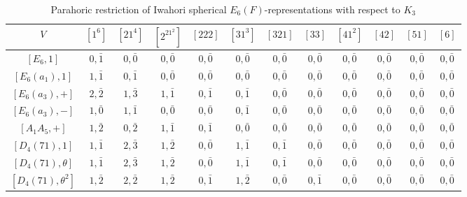     \newpage
    \begin{table}[ht]
        \centering
        \caption{Parahoric restriction of Iwahori spherical $E_6(F)$-representations with respect to $K_3$}
        \label{tab:e6_WJ3_restriction_final}
        \begin{adjustbox}{max width=\linewidth}
        \begin{tabular}{|c|ccccccccccc|}
        \hline
        $V$ & $[1^6]$ & $[21^4]$ & $[2^21^2]$ & $[222]$ & $[31^3]$ & $[321]$ & $[33]$ & $[41^2]$ & $[42]$ & $[51]$ & $[6]$ \\ \hline
        $[E_6, 1]$             & $0, \bar{1}$ & $0, \bar{0}$ & $0, \bar{0}$ & $0, \bar{0}$ & $0, \bar{0}$ & $0, \bar{0}$ & $0, \bar{0}$ & $0, \bar{0}$ & $0, \bar{0}$ & $0, \bar{0}$ & $0, \bar{0}$ \\ \hline

        $[E_6(a_1), 1]$        & $1, \bar{1}$ & $0, \bar{1}$ & $0, \bar{0}$ & $0, \bar{0}$ & $0, \bar{0}$ & $0, \bar{0}$ & $0, \bar{0}$ & $0, \bar{0}$ & $0, \bar{0}$ & $0, \bar{0}$ & $0, \bar{0}$ \\ \hline

        $[E_6(a_3), +]$        & $2, \bar{2}$ & $1, \bar{3}$ & $1, \bar{1}$ & $0, \bar{1}$ & $0, \bar{1}$ & $0, \bar{0}$ & $0, \bar{0}$ & $0, \bar{0}$ & $0, \bar{0}$ & $0, \bar{0}$ & $0, \bar{0}$ \\
        $[E_6(a_3), -]$        & $1, \bar{0}$ & $1, \bar{1}$ & $0, \bar{0}$ & $0, \bar{0}$ & $0, \bar{1}$ & $0, \bar{0}$ & $0, \bar{0}$ & $0, \bar{0}$ & $0, \bar{0}$ & $0, \bar{0}$ & $0, \bar{0}$ \\
        $[A_1A_5, +]$          & $1, \bar{2}$ & $0, \bar{2}$ & $1, \bar{1}$ & $0, \bar{1}$ & $0, \bar{0}$ & $0, \bar{0}$ & $0, \bar{0}$ & $0, \bar{0}$ & $0, \bar{0}$ & $0, \bar{0}$ & $0, \bar{0}$ \\ \hline

        $[D_4(71), 1]$         & $1, \bar{1}$ & $2, \bar{3}$ & $1, \bar{2}$ & $0, \bar{0}$ & $1, \bar{1}$ & $0, \bar{1}$ & $0, \bar{0}$ & $0, \bar{0}$ & $0, \bar{0}$ & $0, \bar{0}$ & $0, \bar{0}$ \\ 
        $[D_4(71), \theta]$    & $1, \bar{1}$ & $2, \bar{3}$ & $1, \bar{2}$ & $0, \bar{0}$ & $1, \bar{1}$ & $0, \bar{1}$ & $0, \bar{0}$ & $0, \bar{0}$ & $0, \bar{0}$ & $0, \bar{0}$ & $0, \bar{0}$ \\
        $[D_4(71), \theta^2]$  & $1, \bar{2}$ & $2, \bar{2}$ & $1, \bar{2}$ & $0, \bar{1}$ & $1, \bar{2}$ & $0, \bar{0}$ & $0, \bar{1}$ & $0, \bar{0}$ & $0, \bar{0}$ & $0, \bar{0}$ & $0, \bar{0}$ \\\hline
        

\end{tabular}
\end{adjustbox}
\end{table}
